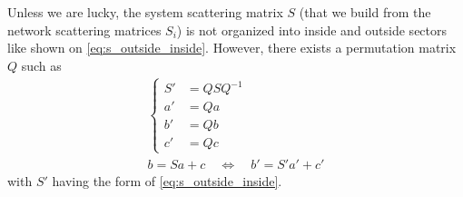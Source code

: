 Unless we are lucky, the system scattering matrix $S$ (that we build from the network scattering matrices $S_i$) is not organized into inside and outside sectors like shown on \cref{eq:s_outside_inside}.
However, there exists a permutation matrix~$Q$ such as
\begin{gather}
    \left\lbrace
    \begin{aligned}
        S' &= Q S Q^{-1} \\
        a' &= Q a \\
        b' &= Q b \\
        c' &= Q c
    \end{aligned}
    \right.
    \label{eq:permute_s}
    \\
    b = S a + c\quad \Longleftrightarrow \quad b' = S' a' +c'\label{eq:permute_s_equiv}
\end{gather}
with $S'$ having the form of \cref{eq:s_outside_inside}.

